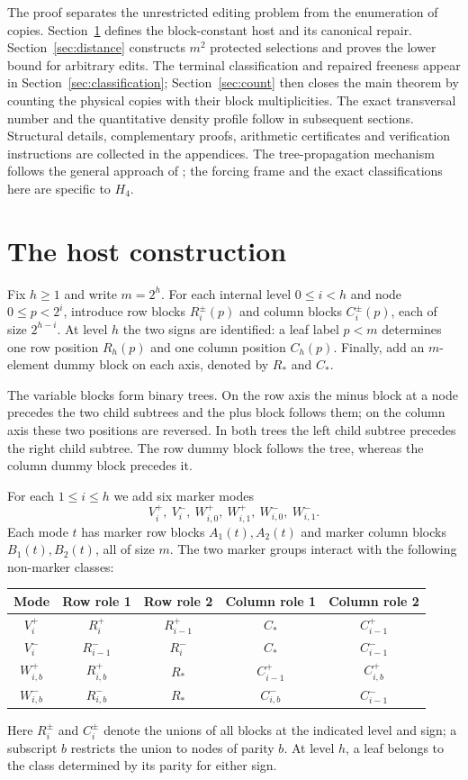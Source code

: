 \documentclass[11pt]{article}
\begin{document}
The proof separates the unrestricted editing problem from the enumeration
of copies. Section~\ref{sec:host} defines the block-constant host and its
canonical repair. Section~\ref{sec:distance} constructs $m^2$ protected
selections and proves the lower bound for arbitrary edits. The terminal
classification and repaired freeness appear in
Section~\ref{sec:classification}; Section~\ref{sec:count} then closes the
main theorem by counting the physical copies with their block
multiplicities. The exact transversal number and the quantitative density
profile follow in subsequent sections. Structural details, complementary
proofs, arithmetic certificates and verification instructions are collected
in the appendices. The tree-propagation mechanism follows the general
approach of \cite{OAI}; the forcing frame and the exact classifications
here are specific to $H_4$.

\section{The host construction}\label{sec:host}
Fix $h\ge1$ and write $m=2^h$. For each internal level $0\le i<h$ and
node $0\le p<2^i$, introduce row blocks $R_i^\pm(p)$ and column blocks
$C_i^\pm(p)$, each of size $2^{h-i}$. At level $h$ the two signs are
identified: a leaf label $p<m$ determines one row position $R_h(p)$ and
one column position $C_h(p)$. Finally, add an $m$-element dummy block on
each axis, denoted by $R_*$ and $C_*$.

The variable blocks form binary trees. On the row axis the minus block at a
node precedes the two child subtrees and the plus block follows them; on
the column axis these two positions are reversed. In both trees the left
child subtree precedes the right child subtree. The row dummy block follows
the tree, whereas the column dummy block precedes it.

For each $1\le i\le h$ we add six marker modes
\[
 V_i^+,\ V_i^-,\ W_{i,0}^+,\ W_{i,1}^+,
 \ W_{i,0}^-,\ W_{i,1}^-.
\]
Each mode $t$ has marker row blocks $A_1(t),A_2(t)$ and marker column
blocks $B_1(t),B_2(t)$, all of size $m$. The two marker
groups interact with the following non-marker classes:
\begin{center}\small
\begin{tabular}{c|cc|cc}\toprule
Mode&Row role 1&Row role 2&Column role 1&Column role 2\\\midrule
$V_i^+$&$R_i^+$&$R_{i-1}^+$&$C_*$&$C_{i-1}^+$\\
$V_i^-$&$R_{i-1}^-$&$R_i^-$&$C_*$&$C_{i-1}^-$\\
$W_{i,b}^+$&$R_{i,b}^+$&$R_*$&$C_{i-1}^+$&$C_{i,b}^+$\\
$W_{i,b}^-$&$R_{i,b}^-$&$R_*$&$C_{i,b}^-$&$C_{i-1}^-$\\\bottomrule
\end{tabular}
\end{center}
Here $R_i^\pm$ and $C_i^\pm$ denote the unions of all blocks at the
indicated level and sign; a subscript $b$ restricts the union to nodes of
parity $b$. At level $h$, a leaf
belongs to the class determined by its parity for either sign.
\end{document}
